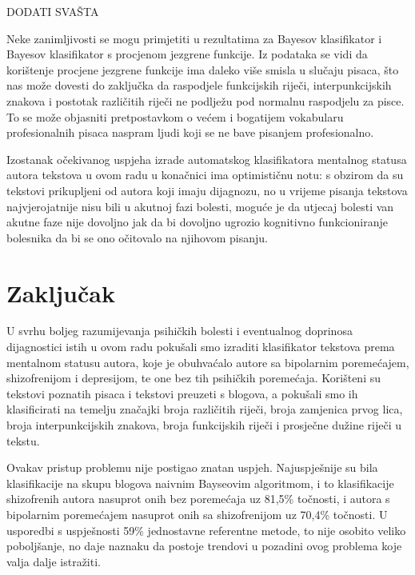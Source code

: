 \documentclass[10pt, a4paper]{article}
\begin{document}
DODATI SVAŠTA

Neke zanimljivosti se mogu primjetiti u rezultatima za Bayesov klasifikator i Bayesov klasifikator s procjenom jezgrene funkcije. Iz podataka se vidi da korištenje procjene jezgrene funkcije ima daleko više smisla u slučaju pisaca, što nas može dovesti do zaključka da raspodjele funkcijskih riječi, interpunkcijskih znakova i postotak različitih riječi ne podlježu pod normalnu raspodjelu za pisce. To se može objasniti pretpostavkom o većem i bogatijem vokabularu profesionalnih pisaca naspram ljudi koji se ne bave pisanjem profesionalno.

Izostanak očekivanog uspjeha izrade automatskog klasifikatora mentalnog statusa autora tekstova u ovom radu u konačnici ima optimističnu notu: s obzirom da su tekstovi prikupljeni  od autora koji imaju dijagnozu, no u vrijeme pisanja tekstova najvjerojatnije nisu bili u akutnoj fazi bolesti, moguće je da utjecaj bolesti van akutne faze nije dovoljno jak da bi dovoljno ugrozio kognitivno funkcioniranje bolesnika da bi se ono očitovalo na njihovom pisanju. 




\section{Zaključak}

U svrhu boljeg razumijevanja psihičkih bolesti i eventualnog doprinosa dijagnostici istih u ovom radu pokušali smo izraditi klasifikator tekstova prema mentalnom statusu autora, koje je obuhvaćalo autore sa bipolarnim poremećajem, shizofrenijom i depresijom, te one bez tih psihičkih poremećaja. Korišteni su tekstovi poznatih pisaca i tekstovi preuzeti s blogova, a pokušali smo ih klasificirati na temelju značajki broja različitih riječi, broja zamjenica prvog lica, broja interpunkcijskih znakova, broja funkcijskih riječi i prosječne dužine riječi u tekstu. 

Ovakav pristup problemu nije postigao znatan uspjeh. Najuspješnije su bila klasifikacije na skupu blogova naivnim Bayseovim algoritmom, i to klasifikacije shizofrenih autora nasuprot onih bez poremećaja uz 81,5\% točnosti, i autora s bipolarnim poremećajem nasuprot onih sa shizofrenijom uz 70,4\% točnosti. U usporedbi s uspješnosti 59\% jednostavne referentne metode, to nije osobito veliko poboljšanje, no daje naznaku da postoje trendovi u pozadini ovog problema koje valja dalje istražiti. 
\end{document}
